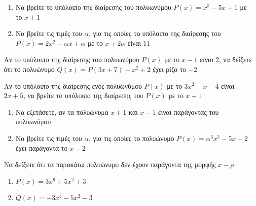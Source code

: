 \documentclass[greek]{beamer}
\begin{document}
\begin{askisi}
  \begin{enumerate}
    \item<1-> Να βρείτε το υπόλοιπο της διαίρεσης του πολυωνύμου $P(x)=x^3-5x+1$ με το $x+1$
    \item<2-> Να βρείτε τις τιμές του $α$, για τις οποίες το υπόλοιπο της διαίρεσης του $P(x)=2x^2-αx+α$ με το $x+2α$ είναι $11$
  \end{enumerate}


\end{askisi}

\begin{askisi}
  Αν το υπόλοιπο της διαίρεσης του πολυωνύμου $P(x)$ με το $x-1$ είναι $2$, να δείξετε ότι το πολυώνυμο $Q(x)=P(3x+7)-x^2+2$ έχει ρίζα το $-2$


\end{askisi}

\begin{askisi}
  Αν το υπόλοιπο της διαίρεσης ενός πολυωνύμου $P(x)$ με το $3x^2-x-4$ είναι $2x+5$, να βρείτε το υπόλοιπο της διαίρεσης του $P(x)$ με το $x+1$


\end{askisi}

\begin{askisi}
  \begin{enumerate}
    \item<1-> Να εξετάσετε, αν τα πολυώνυμα $x+1$ και $x-1$ είναι παράγοντας του πολυωνύμου
    \item<2-> Να βρείτε τις τιμές του $α$, για τις οποίες το πολυώνυμο $P(x)=α^3x^3-5x+2$ έχει παράγοντα το $x-2$
  \end{enumerate}


\end{askisi}

\begin{askisi}
  Να δείξετε ότι τα παρακάτω πολυώνυμο δεν έχουν παράγοντα της μορφής $x-ρ$
  \begin{enumerate}
    \item<1-> $P(x)=3x^6+5x^2+3$
    \item<2-> $Q(x)=-3x^4-5x^2-3$
  \end{enumerate}


\end{askisi}
\end{document}
